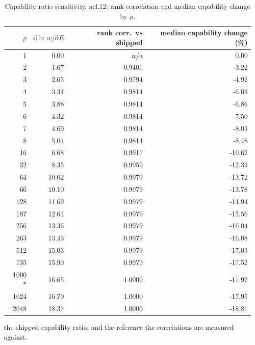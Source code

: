 \begin{table}[htbp]
  \centering
  \caption{Capability ratio sensitivity, acl.12: rank correlation and median capability change by $\rho$.}
  \label{tab:rho-acl-12-summary}
  \begin{tabular}{r r r r}
    \toprule
    $\rho$ & $\mathrm{d}\ln w/\mathrm{d}E$ & rank corr.\ vs shipped & median capability change (\%) \\
    \midrule
    1 & 0.00 & n/a & 0.00 \\
    2 & 1.67 & 0.9401 & -3.22 \\
    3 & 2.65 & 0.9794 & -4.92 \\
    4 & 3.34 & 0.9814 & -6.03 \\
    5 & 3.88 & 0.9814 & -6.86 \\
    6 & 4.32 & 0.9814 & -7.50 \\
    7 & 4.69 & 0.9814 & -8.03 \\
    8 & 5.01 & 0.9814 & -8.48 \\
    16 & 6.68 & 0.9917 & -10.62 \\
    32 & 8.35 & 0.9959 & -12.33 \\
    64 & 10.02 & 0.9979 & -13.72 \\
    66 & 10.10 & 0.9979 & -13.78 \\
    128 & 11.69 & 0.9979 & -14.94 \\
    187 & 12.61 & 0.9979 & -15.56 \\
    256 & 13.36 & 0.9979 & -16.04 \\
    263 & 13.43 & 0.9979 & -16.08 \\
    512 & 15.03 & 0.9979 & -17.03 \\
    735 & 15.90 & 0.9979 & -17.52 \\
    1000 * & 16.65 & 1.0000 & -17.92 \\
    1024 & 16.70 & 1.0000 & -17.95 \\
    2048 & 18.37 & 1.0000 & -18.81 \\
    \bottomrule
  \end{tabular}
  \par\smallskip\footnotesize * the shipped capability ratio, and the reference the correlations are measured against.
\end{table}
